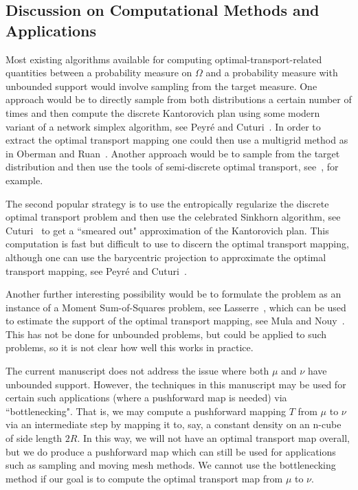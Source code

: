 \documentclass{amsart}
\theoremstyle{lemma}
\theoremstyle{remark}
\begin{document}
\subsection{Discussion on Computational Methods and Applications}

Most existing algorithms available for computing optimal-transport-related quantities between a probability measure on $\Omega$ and a probability measure with unbounded support would involve sampling from the target measure. One approach would be to directly sample from both distributions a certain number of times and then compute the discrete Kantorovich plan using some modern variant of a network simplex algorithm, see Peyr\'{e} and Cuturi~\cite{Peyre_ComputationalOT}. In order to extract the optimal transport mapping one could then use a multigrid method as in Oberman and Ruan~\cite{obermanruan}. Another approach would be to sample from the target distribution and then use the tools of semi-discrete optimal transport, see~\cite{semidiscrete}, for example.

The second popular strategy is to use the entropically regularize the discrete optimal transport problem and then use the celebrated Sinkhorn algorithm, see Cuturi~\cite{cuturi} to get a ``smeared out" approximation of the Kantorovich plan. This computation is fast but difficult to use to discern the optimal transport mapping, although one can use the barycentric projection to approximate the optimal transport mapping, see Peyr\'{e} and Cuturi~\cite{Peyre_ComputationalOT}.

Another further interesting possibility would be to formulate the problem as an instance of a Moment Sum-of-Squares problem, see Lasserre~\cite{lasserre}, which can be used to estimate the support of the optimal transport mapping, see Mula and Nouy~\cite{momentsosOT}. This has not be done for unbounded problems, but could be applied to such problems, so it is not clear how well this works in practice.

The current manuscript does not address the issue where both $\mu$ and $\nu$ have unbounded support. However, the techniques in this manuscript may be used for certain such applications (where a pushforward map is needed) via ``bottlenecking". That is, we may compute a pushforward mapping $T$ from $\mu$ to $\nu$ via an intermediate step by mapping it to, say, a constant density on an n-cube of side length $2R$. In this way, we will not have an optimal transport map overall, but we do produce a pushforward map which can still be used for applications such as sampling and moving mesh methods. We cannot use the bottlenecking method if our goal is to compute the optimal transport map from $\mu$ to $\nu$.
\end{document}

